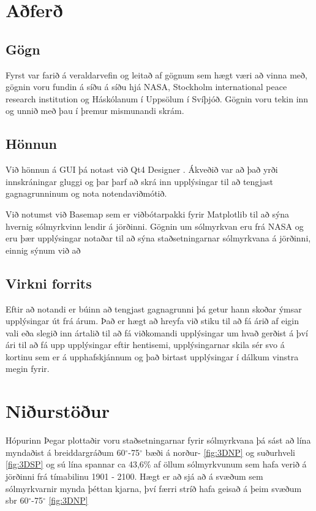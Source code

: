 \documentclass[12pt, git, final]{rureport}
\begin{document}
\section{Aðferð}
\subsection{Gögn}
Fyrst var farið á veraldarvefin og leitað af gögnum sem hægt væri að vinna með, gögnin voru fundin á síðu á síðu hjá NASA\cite{Eclipse}, Stockholm international peace research institution\cite{weapon} og Háskólanum í Uppsölum í Svíþjóð\cite{conflict}. Gögnin voru tekin inn og unnið með þau í þremur mismunandi skrám.
\subsection{Hönnun}
Við hönnun á GUI þá notast  við Qt4 Designer \cite{qt4}. Ákveðið var að það yrði innskráningar gluggi og þar þarf að skrá inn upplýsingar til að tengjast gagnagrunninum og nota notendaviðmótið.

Við notumst við Basemap\cite{basemap} sem er viðbótarpakki fyrir Matplotlib til að sýna hvernig sólmyrkvinn lendir á jörðinni. Gögnin um sólmyrkvan eru frá NASA og eru þær upplýsingar notaðar til að sýna staðsetningarnar sólmyrkvana á jörðinni, einnig sýnum við að 

\subsection{Virkni forrits}
Eftir að notandi er búinn að tengjast gagnagrunni þá getur hann skoðar ýmsar upplýsingar út frá árum. Það er hægt að hreyfa við stiku til að fá árið af eigin vali eða slegið inn ártalið til að fá viðkomandi upplýsingar um hvað gerðist á því ári til að fá upp upplýsingar eftir hentisemi, upplýsingarnar skila sér svo á kortinu sem er á upphafskjánnum og það birtast upplýsingar í dálkum vinstra megin fyrir. 


\section{Niðurstöður}\label{nidurstodur}
Hópurinn
Þegar plottaðir voru staðsetningarnar fyrir sólmyrkvana þá sást að lína myndaðist á breiddargráðum 60$^{\circ}$-75$^{\circ}$ bæði á norður- \ref{fig:3DNP} og suðurhveli \ref{fig:3DSP} og sú lína spannar ca 43,6\% af öllum sólmyrkvunum sem hafa verið á jörðinni frá tímabilinu 1901 - 2100. Hægt er að sjá að á svæðum sem sólmyrkvarnir mynda þéttan kjarna, því færri stríð hafa geisað á þeim svæðum sbr 60$^{\circ}$-75$^{\circ}$ \ref{fig:3DNP}
\pagebreak
\end{document}
